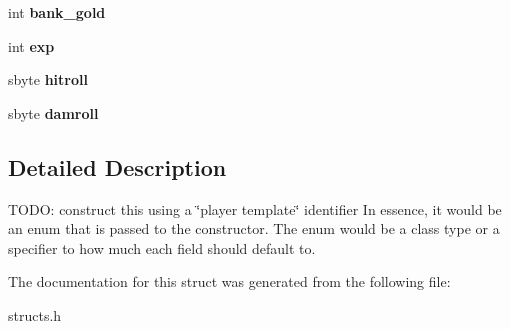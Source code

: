 \begin{DoxyCompactItemize}
int {\bfseries bank\+\_\+gold}
\item 
\mbox{\label{structchar__point__data_a2deb4c3b946091f2abb1a3bf581f0b9b}} 
int {\bfseries exp}
\item 
\mbox{\label{structchar__point__data_a251a7616a5998ff61f42d8d1f1edb595}} 
sbyte {\bfseries hitroll}
\item 
\mbox{\label{structchar__point__data_a0631f7bdecef7b5c363b7a4cbfe574f4}} 
sbyte {\bfseries damroll}
\end{DoxyCompactItemize}


\subsection{Detailed Description}
T\+O\+DO\+: construct this using a \char`\"{}player template\char`\"{} identifier In essence, it would be an enum that is passed to the constructor. The enum would be a class type or a specifier to how much each field should default to. 

The documentation for this struct was generated from the following file\+:\begin{DoxyCompactItemize}
\item 
structs.\+h\end{DoxyCompactItemize}
